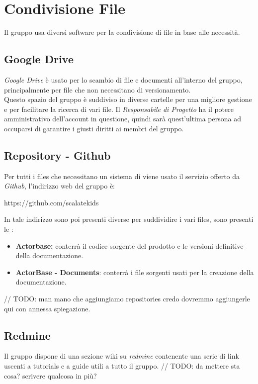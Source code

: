 \section{Condivisione File}
Il gruppo usa diversi software per la condivisione di file in base alle necessità.

\subsection{Google Drive}
\textit{Google Drive} è usato per lo scambio di file e documenti all'interno del gruppo, principalmente per file che non necessitano di versionamento.\\
Questo spazio del gruppo è suddiviso in diverse cartelle per una migliore gestione e per facilitare la ricerca di vari file.
Il \textit{Responsabile di Progetto} ha il potere amministrativo dell'account in questione, quindi sarà quest'ultima persona ad occuparsi di garantire i giusti diritti ai membri del gruppo.

\subsection{Repository - Github}
Per tutti i files che necessitano un sistema di  viene usato il servizio offerto da \textit{Github}, l'indirizzo web del gruppo è:
\begin{center}
https://github.com/scalatekids
\end{center}



In tale indirizzo sono poi presenti diverse  per suddividire i vari files, sono presenti le :
\begin{itemize}
  \item \textbf{Actorbase:} conterrà il codice sorgente del prodotto e le versioni definitive della documentazione.
  \item \textbf{ActorBase - Documents}: conterrà i file sorgenti usati per la creazione della documentazione.
\end{itemize}
	// TODO: man mano che aggiungiamo repositories credo dovremmo aggiungerle qui con annessa spiegazione.

\subsection{Redmine}
Il gruppo dispone di una sezione wiki su \textit{redmine} contenente una serie di link uscenti a tutorials e a guide utili a tutto il gruppo.
// TODO: da mettere sta cosa? scrivere qualcosa in più?
